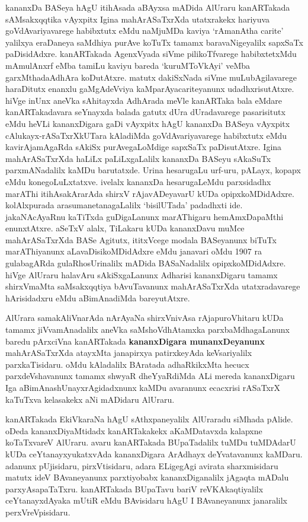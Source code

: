 \documentclass[11pt,a4size]{article}
\begin{document}
kananxDa BASeya hAgU itihAsada aBAyxsa mADida AlUraru kanARTakada
sAMsakxqqtika vAyxpitx Igina mahArASaTxrXda utatxrakekx hariyuva
goVdAvariyavarege habibxtutx eMdu naMjuMDa kaviya `rAmanAtha carite'
yalilxya eraDaneya saMdhiya purAve koTuTx tamamx baravaNigeyalilx
sapxSaTx paDisidAdxre. kanARTakada AgenxVyada siVme pilikoTfvarege
habibxtetxMdu mAmulAnxrf eMba tamiLu kaviyu bareda `kuruMToVkAyi'
veMba garxMthada\break AdhAra koDutAtxre. matutx dakiSxNada siVme
muLubAgilavarege haraDitutx enanxlu gaMgAdeVviya kaMparAyacariteyanunx
udadhxrisutAtxre. hiVge inUnx aneVka sAhitayxda AdhArada meVle
kanARTaka bala eMdare kanARTakadavara seYnayxda balada gatutx dUra
dUradavarege pasarisitutx eMdu heVLi kananxDigara gaDi vAyxpitx hAgU
kananxDa BASeya vAyxpitx cAlukayx-rASaTxrXkUTara kAladiMda
goVdAvariyavarege habibxtutx eMdu kavirAjamAgaRda sAkiSx
purAvegaLoMdige sapxSaTx paDisutAtxre. Igina mahArASaTxrXda haLiLx
paLiLxgaLalilx kananxDa BASeyu sAkaSuTx parxmANadalilx kaMDu
barutatxde. Urina hesarugaLu urf-uru, pALayx, kopapx eMdu
konegoLuLxtatxve. ivelalx kananxDa hesarugaLeMdu parxsidadhx marAThi
itihAsakArarAda shirxV rAjavADeyavarU kUDa
opipxkoMDidAdxre. kolAlxpurada arasumanetanagaLalilx `bisilUTada'
padadhxti ide. jakaNAcAyaRnu kaTiTxda guDigaLanunx marAThigaru
hemAmxDapaMthi enunxtAtxre. aSeTxV alalx, TiLakaru kUDa kananxDavu
muMce mahArASaTxrXda BASe Agitutx, ititxVcege modala BASeyanunx biTuTx
marAThiyanunx aLavaDisikoMDidAdxre eMdu janavari oMdu 1907 ra
gulabagARda gulaRhosUrinalilx mADida BASaNadalilx
opipxkoMDidAdxre. hiVge AlUraru halavAru sAkiSxgaLanunx Adharisi
kananxDigaru tamamx shirxVmaMta saMsakxqqtiya bAvuTavanunx
mahArASaTxrXda utatxradavarege hArisidadxru eMdu aBimAnadiMda
bareyutAtxre.

AlUrara samakAliVnarAda nArAyaNa shirxVnivAsa rAjapuroVhitaru kUDa
tamamx jiVvamAnadalilx aneVka saMshoVdhAtamxka parxbaMdhagaLanunx
baredu pArxciVna kanARTakada \textbf{kananxDigara munanxDeyanunx}
mahArASaTxrXda atayxMta janapirxya patirxkeyAda keVsariyalilx
parxkaTisidaru. oMdu kAladalilx BAratada adhaRkikxMta hecucx
parxdeVshavanunx tamamx shwyaR dheYyaRdiMda ALi mereda kananxDigaru
Iga aBimAnashUnayxrAgidadxnunx kaMDu avaranunx ecacxrisi rASaTxrX
kaTuTxva kelasakekx aNi mADidaru AlUraru. 

kanARTakada EkiVkaraNa hAgU sAthxpaneyalilx AlUraradu siMhada
pAlide. oDeda kananxDiyaMtidadx kanARTakakekx aKaMDatavxda kalapxne
koTaTxvareV AlUraru. avaru kanARTakada BUpaTadalilx tuMDu tuMDAdarU
kUDa ceYtanayxyukatxvAda kananxDigara ArAdhayx deYvatavanunx
kaMDaru. adanunx pUjisidaru, pirxVtisidaru, adara ELigegAgi avirata
sharxmisidaru matutx ideV BAvaneyanunx parxtiyobabx kananxDiganalilx
jAgaqta mADalu parxyAsapaTaTxru. kanARTakada BUpaTavu bariV
reVKAkaqtiyalilx ceYtanayxdAyaka mUtiR eMdu BAvisidaru hAgU I
BAvaneyanunx janaralilx perxVreVpisidaru.
\end{document}

